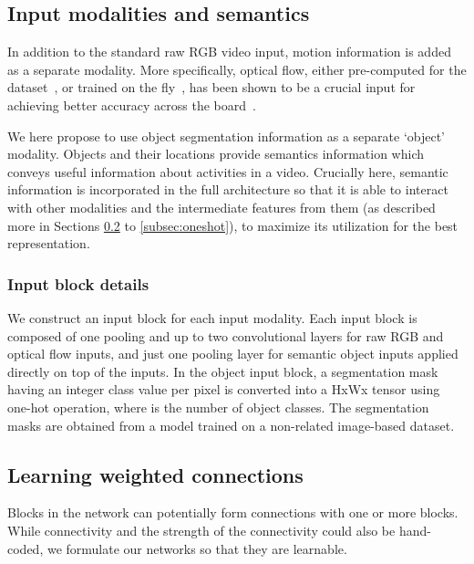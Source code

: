 \documentclass[runningheads]{llncs}
\begin{document}
\subsection{Input modalities and semantics}
\label{sec:semantics}

In addition to the standard raw RGB video input, motion information is added as a separate modality. More specifically, optical flow, either pre-computed for the dataset~\cite{zach2007duality}, or trained on the fly~\cite{fan2018e2e,piergiovanni2018representation}, has been shown to be a crucial input for achieving better accuracy across the board~\cite{carreira2017quo}.


We here propose to use object segmentation information as a separate `object' modality. 
Objects and their locations provide semantics information which conveys useful information about activities in a video.
Crucially here, semantic information is incorporated in the full architecture so that it is able to interact with other modalities and the intermediate features from them (as described more in Sections \ref{subsec:connections} to \ref{subsec:oneshot}), to maximize its utilization for the best representation.





\subsubsection{Input block details}
We construct an input block for each input modality. 
Each input block is composed of one pooling and up to two convolutional layers for raw RGB and optical flow inputs, and just one pooling layer for semantic object inputs applied directly on top of the inputs. In the object input block, a segmentation mask having an integer class value per pixel is converted into a HxWx tensor using one-hot operation, where  is the number of object classes. The segmentation masks are obtained from a model trained on a non-related image-based  dataset.

\subsection{Learning weighted connections}
\label{subsec:connections}

Blocks in the network can potentially form connections with one or more blocks.
While connectivity and the strength of the connectivity could also be hand-coded, we formulate our networks so that they are learnable.
\end{document}
